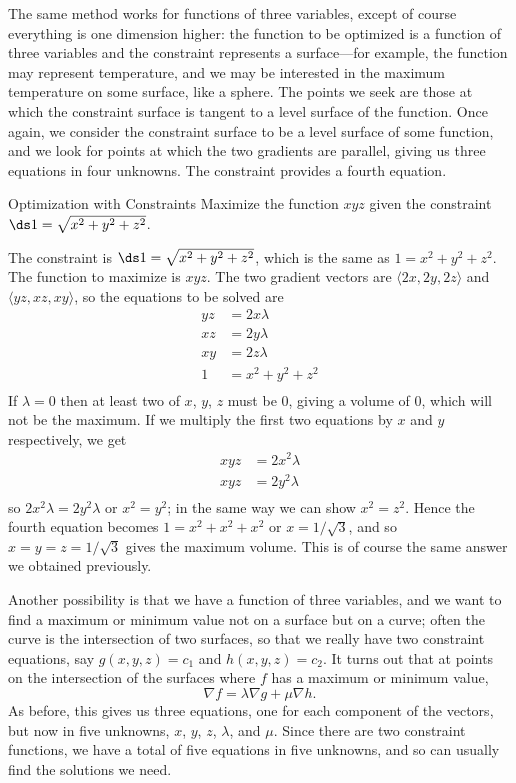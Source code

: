 The same method works for functions of three variables, except of
course everything is one dimension higher: the function to be
optimized is a function of three variables and the constraint represents
a surface---for example, the function may represent temperature, and
we may be interested in the maximum temperature on some surface, like
a sphere.
The points we seek are those at which the constraint
surface is tangent to a level surface of the function. Once again, we
consider the constraint surface to be a level surface of some
function, and we look for points at which the two gradients are
parallel, giving us three equations in four unknowns. The constraint
provides a fourth equation.

\begin{example}{Optimization with Constraints}{}
Maximize the function $xyz$ given the constraint $\ds
1=\sqrt{x^2+y^2+z^2}$.
\end{example}
\begin{solution}
The constraint is $\ds
1=\sqrt{x^2+y^2+z^2}$, which is the same as
$1=x^2+y^2+z^2$. The function to maximize is $xyz$. The two gradient
vectors are $\langle 2x,2y,2z\rangle$ and $\langle yz,xz,xy\rangle$,
so the equations to be solved are
\begin{align*}
yz&=2x\lambda	\\
xz&=2y\lambda	\\
xy&=2z\lambda	\\
1&=x^2+y^2+z^2	\\
\end{align*}
If $\lambda=0$ then at least two of $x$, $y$, $z$ must be 0, giving a
volume of 0, which will not be the maximum. If we multiply the first
two equations by $x$ and $y$ respectively, we get
\begin{align*}
xyz&=2x^2\lambda	\\
xyz&=2y^2\lambda	\\
\end{align*}
so $2x^2\lambda=2y^2\lambda$ or $x^2=y^2$; in the same way we can show
$x^2=z^2$. Hence the fourth equation becomes
$1=x^2+x^2+x^2$ or $x=1/\sqrt3$, and so $x=y=z=1/\sqrt3$ gives the
maximum volume. This is of course the same answer we obtained
previously.
\end{solution}

Another possibility is that we have a function of three variables, and
we want to find a maximum or minimum value not on a surface but on a
curve; often the curve is the intersection of two surfaces, so that we
really have two constraint equations, say $g(x,y,z)=c_1$ and
$h(x,y,z)=c_2$. It turns out that at points on the intersection of the
surfaces where $f$ has a maximum or minimum value,
$$\nabla f=\lambda\nabla g+\mu \nabla h.$$
As before, this gives us three equations, one for each component of
the vectors, but now in five unknowns, $x$, $y$, $z$, $\lambda$, and
$\mu$. Since there are two constraint functions, we have a total of
five equations in five unknowns, and so can usually find the solutions
we need.

